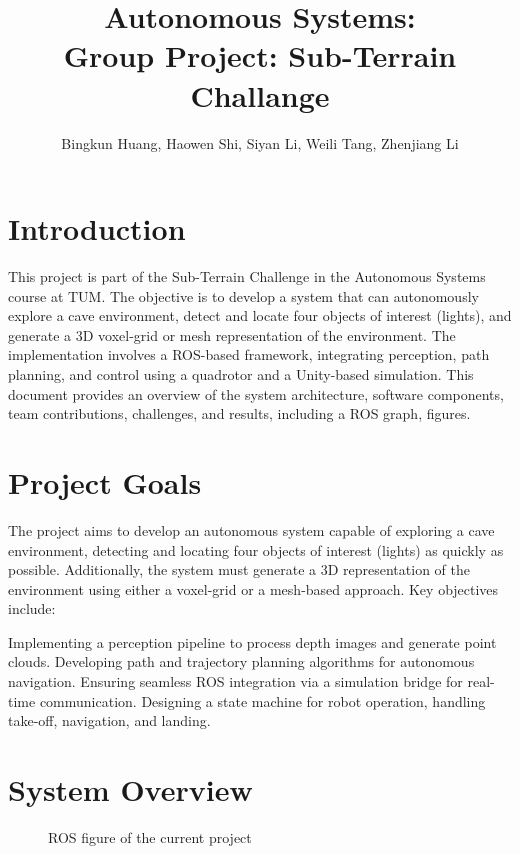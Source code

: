 \documentclass{article}
\title{Autonomous Systems: \\ Group Project: Sub-Terrain Challange}
\author{Bingkun Huang, Haowen Shi, Siyan Li, Weili Tang, Zhenjiang Li}
\date{}
\begin{document}
\maketitle
\pagestyle{fancy}

\section{Introduction}
This project is part of the Sub-Terrain Challenge in the Autonomous Systems course at TUM.
The objective is to develop a system that can autonomously explore a cave environment, detect and locate four objects of interest (lights), and generate a 3D voxel-grid or mesh representation of the environment.
The implementation involves a ROS-based framework, integrating perception, path planning, and control using a quadrotor and a Unity-based simulation.
This document provides an overview of the system architecture, software components, team contributions, challenges, and results, including a ROS graph, figures.

\section{Project Goals}
The project aims to develop an autonomous system capable of exploring a cave environment, detecting and locating four objects of interest (lights) as quickly as possible. Additionally, the system must generate a 3D representation of the environment using either a voxel-grid or a mesh-based approach. Key objectives include:

Implementing a perception pipeline to process depth images and generate point clouds.
Developing path and trajectory planning algorithms for autonomous navigation.
Ensuring seamless ROS integration via a simulation bridge for real-time communication.
Designing a state machine for robot operation, handling take-off, navigation, and landing.


\section{System Overview}

\begin{figure}[h]
    \centering
    \caption{ROS figure of the current project}
    \label{fig:two_images}
\end{figure}
\end{document}

